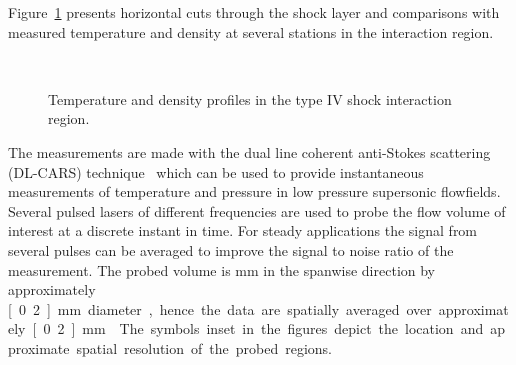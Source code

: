 Figure~\ref{fig:onera_type4_ssi_cuts} presents horizontal cuts through the shock layer and comparisons with measured temperature and density at several stations in the interaction region.
\begin{figure}[hbtp]
  \begin{center}
     \\
    \caption{Temperature and density profiles in the type IV shock interaction region.\label{fig:onera_type4_ssi_cuts}}
  \end{center}
\end{figure}
The measurements are made with the dual line coherent anti-Stokes scattering (DL-CARS) technique~\cite{onera-dsmc-type4,onera-hypersonic-ssi} which can be used to provide instantaneous measurements of temperature and pressure in low pressure supersonic flowfields.  Several pulsed lasers of different frequencies are used to probe the flow volume of interest at a discrete instant in time.  For steady applications the signal from several pulses can be averaged to improve the signal to noise ratio of the measurement.  The probed volume is \unit[40]{mm} in the spanwise direction by approximately \unit[0.2]{mm} diameter, hence the data are spatially averaged over approximately \unit[0.2]{mm}~\cite{onera-hypersonic-ssi}.  The symbols inset in the figures depict the location and approximate spatial resolution of the probed regions.

